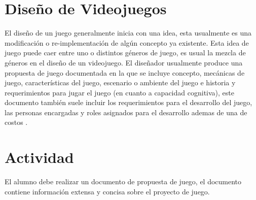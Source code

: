 \section{Diseño de Videojuegos}
El diseño de un juego generalmente inicia con una idea, esta usualmente es una modificación o re-implementación de algún concepto ya existente. Esta idea de juego puede caer entre uno o distintos géneros de juego, es usual la mezcla de géneros en el diseño de un videojuego. El diseñador usualmente produce una propuesta de juego documentada en la que se incluye concepto, mecánicas de juego, características del juego, escenario o ambiente del juego e historia y requerimientos para jugar el juego (en cuanto a capacidad cognitiva), este documento también suele incluir los requerimientos para el desarrollo del juego, las personas encargadas y roles asignados para el desarrollo ademas de una  de costos \cite[p.~101]{erikgamedevelopment}. 

\section{Actividad}
El alumno debe realizar un documento de propuesta de juego, el documento contiene información extensa y concisa sobre el proyecto de juego.

